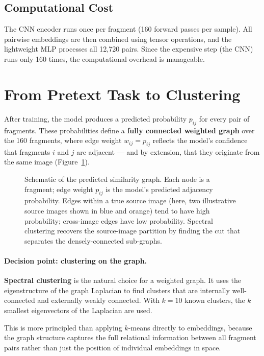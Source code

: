 \documentclass[12pt, a4paper]{article}
\begin{document}
\subsection{Computational Cost}

The CNN encoder runs once per fragment (160 forward passes per sample). All pairwise
embeddings are then combined using tensor operations, and the lightweight MLP processes
all 12,720 pairs. Since the expensive step (the CNN) runs only 160 times, the
computational overhead is manageable.

\section{From Pretext Task to Clustering}

After training, the model produces a predicted probability $p_{ij}$ for every pair of
fragments. These probabilities define a \textbf{fully connected weighted graph} over the
160 fragments, where edge weight $w_{ij} = p_{ij}$ reflects the model's confidence that
fragments $i$ and $j$ are adjacent — and by extension, that they originate from the same
image (Figure~\ref{fig:similarity-graph}).

\begin{figure}[h]
\centering

\caption{Schematic of the predicted similarity graph. Each node is a fragment; edge
weight $p_{ij}$ is the model's predicted adjacency probability. Edges within a true
source image (here, two illustrative source images shown in blue and orange) tend to
have high probability; cross-image edges have low probability. Spectral clustering
recovers the source-image partition by finding the cut that separates the
densely-connected sub-graphs.}
\label{fig:similarity-graph}
\end{figure}

\paragraph{Decision point: clustering on the graph.}
\textbf{Spectral clustering} is the natural choice for a weighted graph. It uses the
eigenstructure of the graph Laplacian to find clusters that are internally
well-connected and externally weakly connected. With $k = 10$ known clusters, the
$k$ smallest eigenvectors of the Laplacian are used.

This is more principled than applying $k$-means directly to embeddings, because the
graph structure captures the full relational information between all fragment pairs
rather than just the position of individual embeddings in space.
\end{document}

